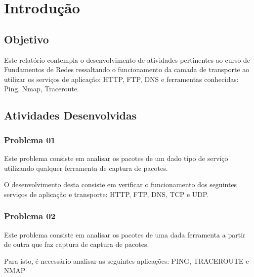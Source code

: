 \chapter[Introdução]{Introdução}

\section{Objetivo}
Este relatório contempla o desenvolvimento de atividades pertinentes ao curso de Fundamentos de Redes
ressaltando o funcionamento da camada de transporte ao utilizar os serviços de aplicação: HTTP, FTP, DNS e ferramentas
conhecidas: Ping, Nmap, Traceroute.

\section{Atividades Desenvolvidas}

\subsection{Problema 01}
Este problema consiste em analisar os pacotes de um dado tipo de serviço utilizando qualquer ferramenta
de captura de pacotes.

O desenvolvimento desta consiste em verificar o funcionamento dos seguintes serviços de aplicação
e transporte: HTTP, FTP, DNS, TCP e UDP.

\subsection{Problema 02}
Este problema consiste em analisar os pacotes de uma dada ferramenta a partir de outra que faz captura de captura de pacotes.

Para isto, é necessário analisar as seguintes aplicações: PING, TRACEROUTE e NMAP

